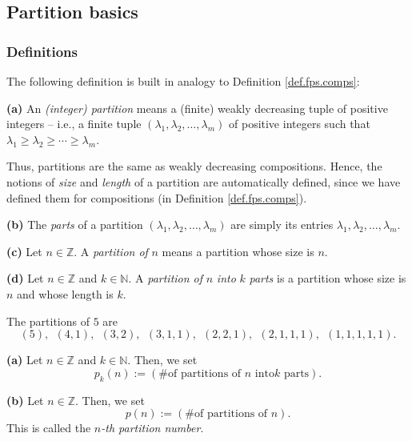 \subsection{Partition basics}

\subsubsection{Definitions}

The following definition is built in analogy to Definition \ref{def.fps.comps}:

\begin{definition}
\label{def.pars.parts}\textbf{(a)} An \emph{(integer) partition} means a
(finite) weakly decreasing tuple of positive integers -- i.e., a finite tuple
$\left(  \lambda_{1},\lambda_{2},\ldots,\lambda_{m}\right)  $ of positive
integers such that $\lambda_{1}\geq\lambda_{2}\geq\cdots\geq\lambda_{m}$.

Thus, partitions are the same as weakly decreasing compositions. Hence, the
notions of \emph{size} and \emph{length} of a partition are automatically
defined, since we have defined them for compositions (in Definition
\ref{def.fps.comps}). \medskip

\textbf{(b)} The \emph{parts} of a partition $\left(  \lambda_{1},\lambda
_{2},\ldots,\lambda_{m}\right)  $ are simply its entries $\lambda_{1}%
,\lambda_{2},\ldots,\lambda_{m}$. \medskip

\textbf{(c)} Let $n\in\mathbb{Z}$. A \emph{partition of }$n$ means a partition
whose size is $n$. \medskip

\textbf{(d)} Let $n\in\mathbb{Z}$ and $k\in\mathbb{N}$. A \emph{partition of
}$n$\emph{ into }$k$\emph{ parts} is a partition whose size is $n$ and whose
length is $k$.
\end{definition}

\begin{example}
\label{exa.pars.pars5}The partitions of $5$ are%
\[
\left(  5\right)  ,\ \ \left(  4,1\right)  ,\ \ \left(  3,2\right)
,\ \ \left(  3,1,1\right)  ,\ \ \left(  2,2,1\right)  ,\ \ \left(
2,1,1,1\right)  ,\ \ \left(  1,1,1,1,1\right)  .
\]

\end{example}

\begin{definition}
\label{def.pars.pn-pkn}\textbf{(a)} Let $n\in\mathbb{Z}$ and $k\in\mathbb{N}$.
Then, we set%
\[
p_{k}\left(  n\right)  :=\left(  \text{\# of partitions of }n\text{ into
}k\text{ parts}\right)  .
\]


\textbf{(b)} Let $n\in\mathbb{Z}$. Then, we set%
\[
p\left(  n\right)  :=\left(  \text{\# of partitions of }n\right)  .
\]
This is called the $n$\emph{-th partition number}.
\end{definition}

